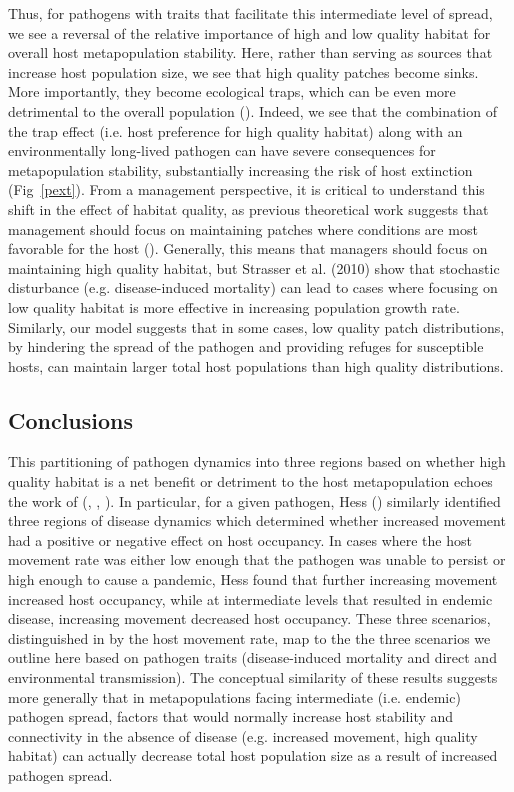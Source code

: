 \documentclass{article}
\begin{document}
Thus, for pathogens with traits that facilitate this intermediate level of spread, we see a reversal of the relative importance of high and low quality habitat for overall host metapopulation stability.
Here, rather than serving as sources that increase host population size, we see that high quality patches become sinks.  
More importantly, they become ecological traps, which can be even more detrimental to the overall population (\cite{Kristan2003}).  
Indeed, we see that the combination of the trap effect (i.e. host preference for high quality habitat) along with an environmentally long-lived pathogen can have severe consequences for metapopulation stability, substantially increasing the risk of host extinction (Fig~\ref{pext}).
From a management perspective, it is critical to understand this shift in the effect of habitat quality, as previous theoretical work suggests that management should focus on maintaining patches where conditions are most favorable for the host (\cite{Strasser2010}). 
Generally, this means that managers should focus on maintaining high quality habitat, but Strasser et al. (2010) show that stochastic disturbance (e.g. disease-induced mortality) can lead to cases where focusing on low quality habitat is more effective in increasing population growth rate.
Similarly, our model suggests that in some cases, low quality patch distributions, by hindering the spread of the pathogen and providing refuges for susceptible hosts, can maintain larger total host populations than high quality distributions.  


\subsection*{Conclusions}  

This partitioning of pathogen dynamics into three regions based on whether high quality habitat is a net benefit or detriment to the host metapopulation echoes the work of (\cite{Hess1996}, \cite{Gog2002}, \cite{Park2012}).
In particular, for a given pathogen, Hess (\cite{Hess1996}) similarly identified three regions of disease dynamics which determined whether increased movement had a positive or negative effect on host occupancy.  
In cases where the host movement rate was either low enough that the pathogen was unable to persist or high enough to cause a pandemic, Hess found that further increasing movement increased host occupancy, while at intermediate levels that resulted in endemic disease, increasing movement decreased host occupancy.
These three scenarios, distinguished in \cite{Hess1996} by the host movement rate, map to the the three scenarios we outline here based on pathogen traits (disease-induced mortality and direct and environmental transmission).
The conceptual similarity of these results suggests more generally that in metapopulations facing intermediate (i.e. endemic) pathogen spread, factors that would normally increase host stability and connectivity in the absence of disease (e.g. increased movement, high quality habitat) can actually decrease total host population size as a result of increased pathogen spread.
\end{document}
